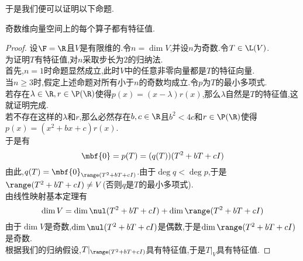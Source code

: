 \documentclass{ctexart}
\begin{document}
于是我们便可以证明以下命题.
\begin{formal}[3.2 奇数维向量空间上的算子]
    奇数维向量空间上的每个算子都有特征值.
\end{formal}
\begin{proof}
    设$\F=\R$且$V$是有限维的.令$n=\dim V$,并设$n$为奇数.令$T\in\L(V)$.\\
    为证明$T$有特征值,对$n$采取步长为$2$的归纳法.\\
    首先,$n=1$时命题显然成立,此时$V$中的任意非零向量都是$T$的特征向量.\\
    当$n\geqslant 3$时,假定上述命题对所有小于$n$的奇数均成立.令$p$为$T$的最小多项式.\\
    若存在$\lambda\in\R,r\in\P(\R)$使得$p(x)=(x-\lambda)r(x)$,那么$\lambda$自然是$T$的特征值,这就证明完成.\\
    若不存在这样的$\lambda$和$r$,那么必然存在$b,c\in\R$且$b^2<4c$和$r\in\P(\R)$使得$p(x)=(x^2+bx+c)r(x)$.\\
    于是有$$\mbf{0}=p(T)=(q(T))(T^2+bT+cI)$$
    由此,$q(T)=\mbf{0}_{\range(T^2+bT+cI)}$.由于$\deg q<\deg p$,于是$\range(T^2+bT+cI)\neq V$(否则$q$是$T$的最小多项式).\\
    由线性映射基本定理有
    $$\dim V=\dim\nul(T^2+bT+cI)+\dim\range(T^2+bT+cI)$$
    由于$\dim V$是奇数,$\dim\nul(T^2+bT+cI)$是偶数,于是$\dim\range(T^2+bT+cI)$是奇数.\\
    根据我们的归纳假设,$T\vert_{\range(T^2+bT+cI)}$具有特征值,于是$T|_V$具有特征值.
\end{proof}
\end{document}
